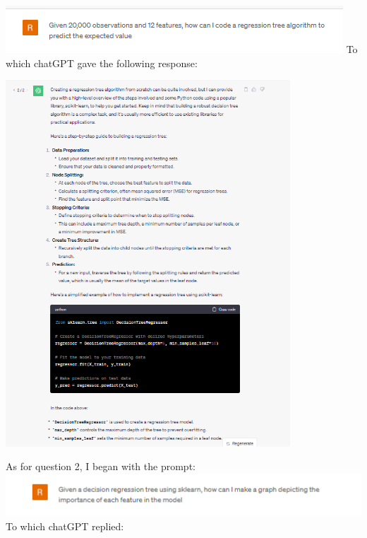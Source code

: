 \documentclass{article}
\begin{document}
\begin{titlepage}
\includegraphics[width=\textwidth]{1.png}
To which chatGPT gave the following response:\\

\begin{center}
\includegraphics[width=0.8\textwidth]{2.png}
\end{center}
\newpage
As for question 2, I began with the prompt:\\
\includegraphics[width=\textwidth]{3.png}
To which chatGPT replied:\\
\begin{center}

\end{center}
\end{titlepage}
\end{document}
